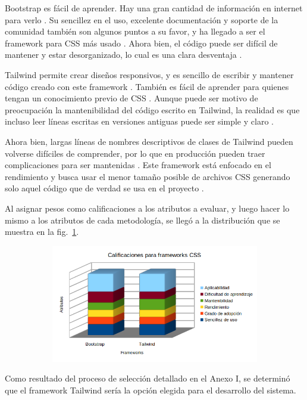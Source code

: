 \documentclass{article}
\begin{document}
Bootstrap es fácil de aprender. Hay una gran cantidad de información en internet para verlo \parencite{hostingerBoostrap}. Su sencillez en el uso, excelente documentación y soporte de la comunidad también son algunos puntos a su favor, y ha llegado a ser el framework para CSS más usado \parencite{developerpitstop}. Ahora bien, el código puede ser difícil de mantener y estar desorganizado, lo cual es una clara desventaja \parencite{tenclouds}.

Tailwind permite crear diseños responsivos, y es sencillo de escribir y mantener código creado con este framework \parencite{hubspot}. También es fácil de aprender para quienes tengan un conocimiento previo de CSS \parencite{kinsta}. Aunque puede ser motivo de preocupación la mantenibilidad del código escrito en Tailwind, la realidad es que incluso leer líneas escritas en versiones antiguas puede ser simple y claro \parencite{oliverDavies}. 

Ahora bien, largas líneas de nombres descriptivos de clases de Tailwind pueden volverse difíciles de comprender, por lo que en producción pueden traer complicaciones para ser mantenidas \parencite{shiminZhang}. Este framework está enfocado en el rendimiento y busca usar el menor tamaño posible de archivos CSS generando solo aquel código que de verdad se usa en el proyecto \parencite{tailwindDocsOptimizing}.

Al asignar pesos como calificaciones a los atributos a evaluar, y luego hacer lo mismo a los atributos de cada metodología, se llegó a la distribución que se muestra en la fig.~\ref{fig:frameworksCSS}.
\begin{figure}[H]
	\caption{Calificaciones para frameworks para CSS}
    \begin{subfigure}{1\textwidth}
	\includegraphics[width=1\textwidth]{calificaciones para frameworks css.png}
    \end{subfigure}
	\label{fig:frameworksCSS}
\end{figure}
\vspace{-1.0\baselineskip}
Como resultado del proceso de selección detallado en el Anexo I, se determinó que el framework Tailwind sería la opción elegida para el desarrollo del sistema.
\end{document}
